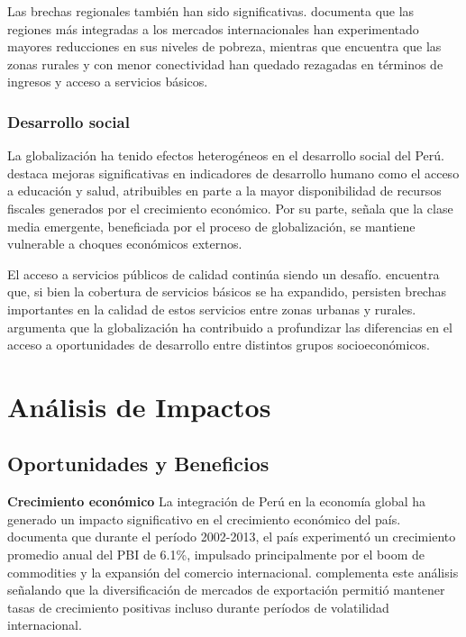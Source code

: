 \documentclass[12pt, a4paper]{article}
\begin{document}
Las brechas regionales también han sido significativas. \textcite{escobal2018geografia} documenta que las regiones más integradas a los mercados internacionales han experimentado mayores reducciones en sus niveles de pobreza, mientras que \textcite{barrantes2019disparidades} encuentra que las zonas rurales y con menor conectividad han quedado rezagadas en términos de ingresos y acceso a servicios básicos.

\subsubsection{Desarrollo social}
La globalización ha tenido efectos heterogéneos en el desarrollo social del Perú. \textcite{vasquez2020inclusion} destaca mejoras significativas en indicadores de desarrollo humano como el acceso a educación y salud, atribuibles en parte a la mayor disponibilidad de recursos fiscales generados por el crecimiento económico. Por su parte, \textcite{franco2019vulnerabilidad} señala que la clase media emergente, beneficiada por el proceso de globalización, se mantiene vulnerable a choques económicos externos.

El acceso a servicios públicos de calidad continúa siendo un desafío. \textcite{sanchez2021servicios} encuentra que, si bien la cobertura de servicios básicos se ha expandido, persisten brechas importantes en la calidad de estos servicios entre zonas urbanas y rurales. \textcite{aramburú2019cohesion} argumenta que la globalización ha contribuido a profundizar las diferencias en el acceso a oportunidades de desarrollo entre distintos grupos socioeconómicos.

\section{Análisis de Impactos}

\subsection{Oportunidades y Beneficios}

\textbf{Crecimiento económico}
La integración de Perú en la economía global ha generado un impacto significativo en el crecimiento económico del país. \textcite{dancourt2018boom} documenta que durante el período 2002-2013, el país experimentó un crecimiento promedio anual del PBI de 6.1\%, impulsado principalmente por el boom de commodities y la expansión del comercio internacional. \textcite{castillo2020exportaciones} complementa este análisis señalando que la diversificación de mercados de exportación permitió mantener tasas de crecimiento positivas incluso durante períodos de volatilidad internacional.
\end{document}
